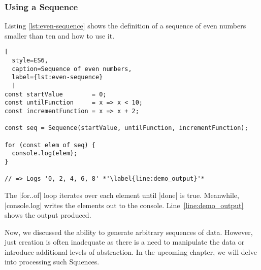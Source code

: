 \subsubsection{Using a Sequence}
\label{subsub:Using a Sequence}
Listing \ref{lst:even-sequence} shows the definition of a sequence of even 
numbers smaller than ten and how to use it. 
\begin{lstlisting}[
  style=ES6, 
  caption=Sequence of even numbers,
  label={lst:even-sequence}
  ]
const startValue        = 0;
const untilFunction     = x => x < 10;
const incrementFunction = x => x + 2;

const seq = Sequence(startValue, untilFunction, incrementFunction);

for (const elem of seq) {
  console.log(elem);
}

// => Logs '0, 2, 4, 6, 8' *'\label{line:demo_output}'*
\end{lstlisting}

The |for..of| loop iterates over each
element until |done| is true. Meanwhile, |console.log| writes the elements out 
to the console. Line~\ref{line:demo_output} shows the output produced.
\newline

Now, we discussed the ability to generate arbitrary sequences of data. However, 
just creation is often inadequate as there is a need to manipulate the data or 
introduce additional levels of abstraction. In the upcoming chapter, we will 
delve into processing such Squences.
